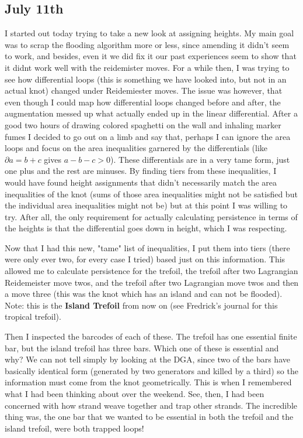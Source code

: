 \documentclass[11pt,oneside]{amsart}
\begin{document}
\subsection{July 11th}
I started out today trying to take a new look at assigning heights. My main goal was to scrap the flooding algorithm more or less, since amending it didn't seem to work, and besides, even it we did fix it our past experiences seem to show that it didnt work well with the reidemister moves. For a while then, I was trying to see how differential loops (this is something we have looked into, but not in an actual knot) changed under Reidemiester moves. The issue was however, that even though I could map how differential loops changed before and after, the augmentation messed up what actually ended up in the linear differential. After a good two hours of drawing colored spaghetti on the wall and inhaling marker fumes I decided to go out on a limb and say that, perhaps I can ignore the area loops and focus on the area inequalities garnered by the differentials (like $\partial a = b + c$ gives $a - b - c >0$). These differentials are in a very tame form, just one plus and the rest are minuses.  By finding tiers from these inequalities, I would have found height assignments that didn't necessarily match the area inequalities of the knot (sums of those area inequalities might not be satisfied but the individual area inequalities might not be) but at this point I was willing to try. After all, the only requirement for actually calculating persistence in terms of the heights is that the differential goes down in height, which I was respecting. 

Now that I had this new, "tame" list of inequalities, I put them into tiers (there were only ever two, for every case I tried) based just on this information. This allowed me to calculate persistence for the trefoil, the trefoil after two Lagrangian Reidemeister move twos, and the trefoil after two Lagrangian move twos and then a move three (this was the knot which has an island and can not be flooded). Note: this is the \textbf{Island Trefoil} from now on (see Fredrick's journal for this tropical trefoil).

Then I inspected the barcodes of each of these. The trefoil has one essential finite bar, but the island trefoil has three bars. Which one of these is essential and why? We can not tell simply by looking at the DGA, since two of the bars have basically identical form (generated by two generators and killed by a third) so the information must come from the knot geometrically. This is when I remembered what I had been thinking about over the weekend. See, then, I had been concerned with how strand weave together and trap other strands. The incredible thing was, the one bar that we wanted to be essential in both the trefoil and the island trefoil, were both trapped loops!
\end{document}
